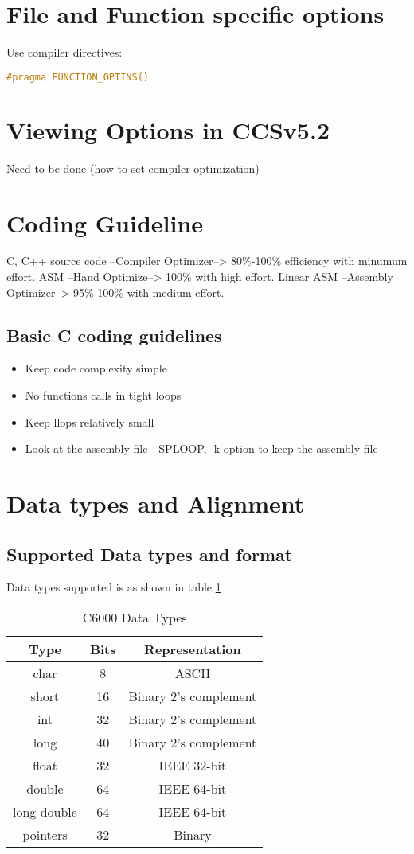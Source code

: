 \documentclass{article}
\begin{document}
\section{File and Function specific options}
Use compiler directives:
\begin{lstlisting}[language=C]
#pragma FUNCTION_OPTINS()
\end{lstlisting}
\section{Viewing Options in CCSv5.2}
Need to be done (how to set compiler optimization)
\section{Coding Guideline}
C, C++ source code --Compiler Optimizer--> 80\%-100\% efficiency with
minumum effort. ASM --Hand Optimize--> 100\% with high effort. Linear
ASM --Assembly Optimizer--> 95\%-100\% with medium effort.
\subsection{Basic C coding guidelines}
\begin{itemize}
\item Keep code complexity simple
\item No functions calls in tight loops
\item Keep llops relatively small
\item Look at the assembly file - SPLOOP, -k option to keep the
  assembly file
\end{itemize}
\section{Data types and Alignment}
\subsection{Supported Data types and format}
Data types supported is as shown in table \ref{table:dataTypes}
\begin{table}
\caption{C6000 Data Types} 
\centering
\begin{tabular}{|c| c| c|}
\hline \hline
Type & Bits  & Representation\\
\hline
char & 8   & ASCII\\
\hline
short & 16   & Binary 2's complement\\
\hline
int & 32   & Binary 2's complement\\
\hline
long & 40   & Binary 2's complement\\
\hline
float & 32   & IEEE 32-bit\\
\hline
double & 64 & IEEE 64-bit\\
\hline
long double & 64 & IEEE 64-bit\\
\hline
pointers & 32 & Binary\\
\hline \hline
\end{tabular}
\label{table:dataTypes}
\end{table}
\end{document}
